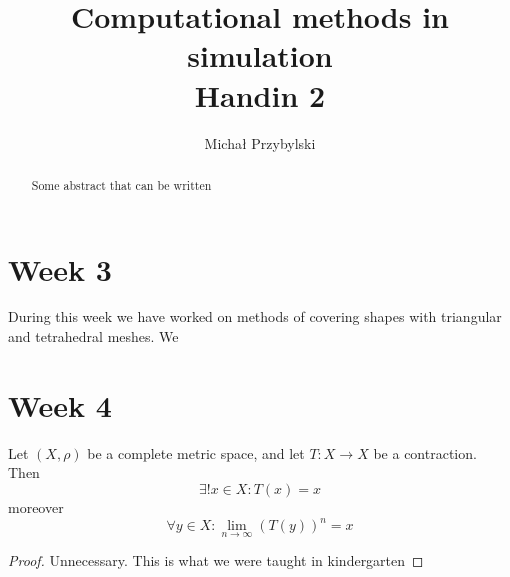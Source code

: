 
\title{\texorpdfstring{Computational methods in simulation\\Handin 2}{}}

\author{Michał Przybylski}

\begin{abstract}
Some abstract that can be written
\end{abstract}


\maketitle


\section*{Week 3}
\tab During this week we have worked on methods of covering shapes with triangular and tetrahedral meshes. We  


\section*{Week 4}
\begin{theorem}
Let $(X, \rho)$ be a complete metric space, and let $T: X\rightarrow X$ be a contraction. Then
$$\exists! x\in X : T(x) = x$$
moreover
$$\forall y\in X: \lim_{n\rightarrow\infty}\left(T(y)\right)^n = x$$
\end{theorem}

\begin{proof}
    Unnecessary. This is what we were taught in kindergarten
\end{proof}

\nocite{cmis_site}







